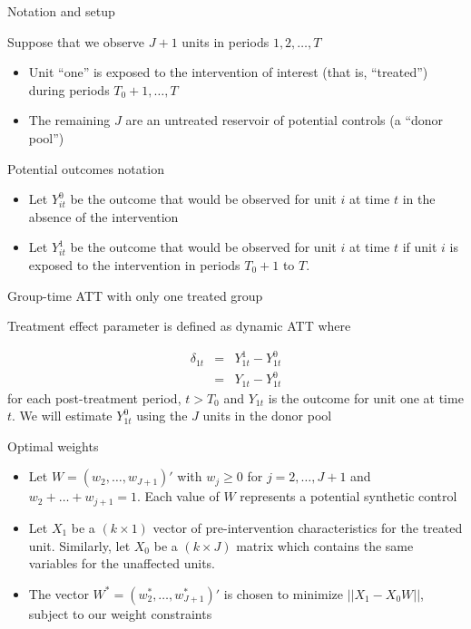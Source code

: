 \documentclass{beamer}
\begin{document}
\begin{frame}{Notation and setup}
	
Suppose that we observe $J+1$ units in periods $1, 2, \dots, T$
		\begin{itemize}
		\item Unit ``one'' is exposed to the intervention of interest (that is, ``treated'') during periods $T_0+1, \dots, T$
		\item The remaining $J$ are an untreated reservoir of potential controls (a ``donor pool'')
		\end{itemize}	
\end{frame}


\begin{frame}{Potential outcomes notation}

		\begin{itemize}
		\item Let $Y_{it}^0$ be the outcome that would be observed for unit $i$ at time $t$ in the absence of the intervention
		\item Let $Y_{it}^1$ be the outcome that would be observed for unit $i$ at time $t$ if unit $i$ is exposed to the intervention in periods $T_0+1$ to $T$.
		\end{itemize}

\end{frame}

\begin{frame}{Group-time ATT with only one treated group}

Treatment effect parameter is defined as dynamic ATT where 

\begin{eqnarray*}
\delta_{1t}&=&Y_{1t}^1 - Y_{1t}^0 \\
&=& Y_{1t} - Y_{1t}^0 
\end{eqnarray*} for each post-treatment period, $t>T_0$ and $Y_{1t}$ is the outcome for unit one at time $t$. We will estimate $Y^0_{1t}$ using the $J$ units in the donor pool 

\end{frame}

\begin{frame}{Optimal weights}
	
	\begin{itemize}
	\item Let $W=(w_2, \dots, w_{J+1})'$ with $w_j\geq 0$ for $j=2, \dots, J+1$ and $w_2+\dots+w_{j+1}=1$. Each value of $W$ represents a potential synthetic control
	\item Let $X_1$ be a $(k\times 1)$ vector of pre-intervention characteristics for the treated unit.  Similarly, let $X_0$ be a $(k\times J)$ matrix which contains the same variables for the unaffected units.
	\item The vector $W^*=(w_2^*, \dots, w_{J+1}^*)'$ is chosen to minimize $||X_1-X_0W||$, subject to our weight constraints
	\end{itemize}
\end{frame}
\end{document}
